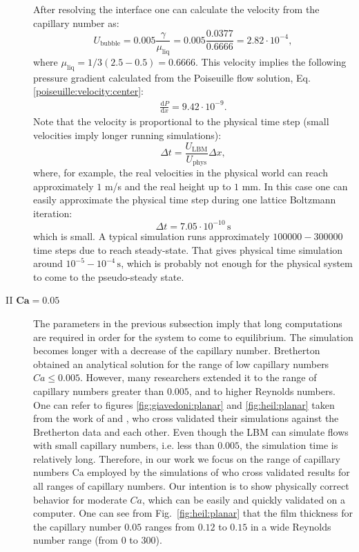 \documentclass[preprint,12pt]{elsarticle}
\newcommand{\Ca}{\mathrm{Ca}}
\begin{document}
\begin{description}
After resolving the interface one can  calculate the
  velocity from the capillary number as:
  \begin{equation}
  U_{\mathrm{bubble}}=0.005 \frac{\gamma}{\mu_{\mathrm{liq}}}=0.005
\frac{0.0377}{0.6666}=2.82 \cdot10^{-4},
  \end{equation}
  where $\mu_{\mathrm{liq}}=1/3 (2.5-0.5)=0.6666$.
  This velocity implies the following pressure gradient calculated from the
  Poiseuille flow solution, Eq. \ref{poiseuille:velocity:center}: 
  \begin{equation}
  \begin{aligned}
  \frac{\mathrm{d}P}{\mathrm{d}x}=9.42 \cdot 10^{-9}.
  \end{aligned}
  \end{equation}
Note that the velocity is proportional to the physical time step (small velocities imply longer
running
simulations):
\begin{equation}
\Delta t =\frac{U_{\mathrm{LBM}}}{U_{\mathrm{phys}}} \Delta x ,
\end{equation}
where, for example, the real velocities in the physical world can reach
approximately $1$ m/s and the real height up to $1$ mm. In this case one
can easily approximate the physical time step during one lattice Boltzmann iteration:
\begin{equation}
\Delta t = 7.05 \cdot 10^{-10} \,\mathrm{s}
\end{equation}
which is small. A typical simulation runs approximately
$100000-300000$ time steps due to reach steady-state. That gives 
physical time simulation around $10^{-5}-10^{-4}\,\mathrm{s}$, which is
probably not enough for the physical system to come to the pseudo-steady state.

 \item[II $\bm{Ca=0.05}$] 
   The parameters in the previous subsection imply that long
computations are required in order for the system to come to equilibrium. The simulation becomes longer with a decrease of the
capillary number. Bretherton obtained an analytical solution for the range of low capillary
numbers $Ca \leq 0.005$. However, many researchers extended it to the range of capillary numbers
greater than
$0.005$, and to higher Reynolds numbers. One can refer to figures
  \ref{fig:giavedoni:planar} and \ref{fig:heil:planar} taken from the work of
  \citet{giavedoni-numerical} and \citet{heil-bretherton}, who cross validated their
  simulations against the Bretherton data and each other. Even though the LBM can simulate
flows with small capillary numbers, i.e. less than $0.005$, the simulation time
is relatively long. Therefore, in our work we focus on the range of capillary numbers $\Ca$
employed by the simulations of
\citet{giavedoni-numerical} who cross validated
results for all ranges of capillary numbers.  Our intention is
  to show physically correct behavior for moderate $Ca$,
which
  can be easily and quickly validated on a computer.
  One can see from Fig.~\ref{fig:heil:planar} that the film thickness for the
  capillary number $0.05$ ranges from $0.12$ to $0.15$ in a wide Reynolds
  number range (from $0$ to $300$).


\end{description}
\end{document}

